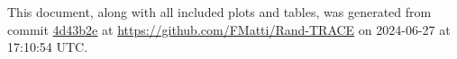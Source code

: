 This document, along with all included plots and tables, was generated from commit \href{https://github.com/FMatti/Rand-TRACE/tree/4d43b2e}{4d43b2e} at \url{https://github.com/FMatti/Rand-TRACE} on 2024-06-27 at 17:10:54 UTC.
